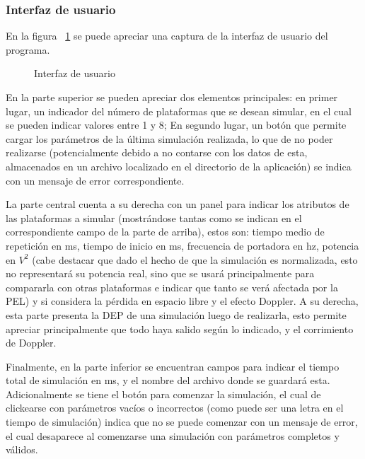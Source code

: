 \documentclass[a4paper,10pt]{article}
\begin{document}
\subsubsection{Interfaz de usuario}
En la figura ~\ref{UI} se puede apreciar una captura de la interfaz de usuario del programa.

\begin{figure}[H]
\centering
{}
\caption{Interfaz de usuario}
\label{UI}
\end{figure}

En la parte superior se pueden apreciar dos elementos principales: en primer lugar, un indicador del número de plataformas que se desean simular, en el cual se pueden indicar valores entre 1 y 8; En segundo lugar, un botón que permite cargar los parámetros de la última simulación realizada, lo que de no poder realizarse (potencialmente debido a no contarse con los datos de esta, almacenados en un archivo localizado en el directorio de la aplicación) se indica con un mensaje de error correspondiente.
\par
La parte central cuenta a su derecha con un panel para indicar los atributos de las plataformas a simular (mostrándose tantas como se indican en el correspondiente campo de la parte de arriba), estos son: tiempo medio de repetición en ms, tiempo de inicio en ms, frecuencia de portadora en hz, potencia en $V^2$ (cabe destacar que dado el hecho de que la simulación es normalizada, esto no representará su potencia real, sino que se usará principalmente para compararla con otras plataformas e indicar que tanto se verá afectada por la PEL) y si considera la pérdida en espacio libre y el efecto Doppler. A su derecha, esta parte presenta la DEP de una simulación luego de realizarla, esto permite apreciar principalmente que todo haya salido según lo indicado, y el corrimiento de Doppler.
\par
Finalmente, en la parte inferior se encuentran campos para indicar el tiempo total de simulación en ms, y el nombre del archivo donde se guardará esta. Adicionalmente se tiene el botón para comenzar la simulación, el cual de clickearse con parámetros vacíos o incorrectos (como puede ser una letra en el tiempo de simulación) indica que no se puede comenzar con un mensaje de error, el cual desaparece al comenzarse una simulación con parámetros completos y válidos.
\end{document}
